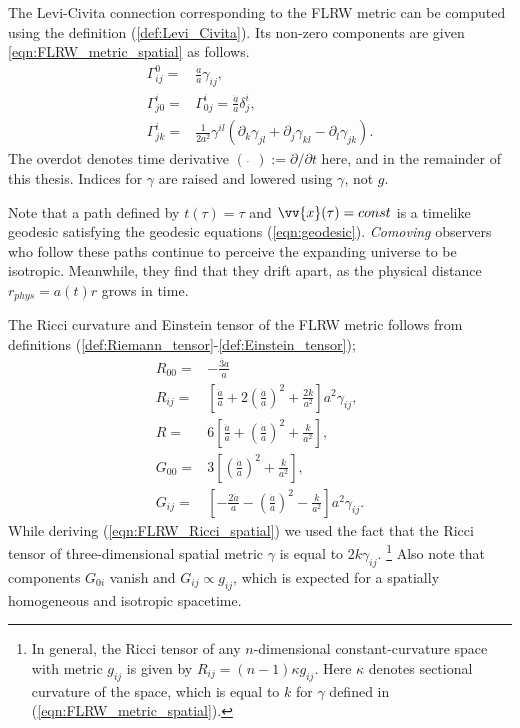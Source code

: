 \documentclass[a4paper,12pt,times,custombib,print,index]{Classes/PhDThesisPSnPDF} %
\providecommand{\DIFadd}[1]{{\protect\color{blue}\uwave{#1}}} %
\providecommand{\DIFaddbegin}{} %
\providecommand{\DIFaddend}{} %
\newcommand{\DIFaddincludegraphics}[2][]{{\color{blue}\fbox{\DIFOincludegraphics[#1]{#2}}}} %
\DeclareRobustCommand{\DIFaddbegin}{\DIFOaddbegin \let\includegraphics\DIFaddincludegraphics} %
\DeclareRobustCommand{\DIFaddend}{\DIFOaddend \let\includegraphics\DIFOincludegraphics} %
\begin{document}
The Levi-Civita connection corresponding to the FLRW metric can be computed using the definition (\ref{def:Levi_Civita}). Its non-zero components are given \DIFaddbegin \DIFadd{in terms of $\gamma$ }\eqref{eqn:FLRW_metric_spatial} \DIFaddend as follows.
\begin{align}
	\Gamma^0_{ij} =& \frac{\dot{a}}{a} \gamma_{ij}, \label{eqn:homogenous_christoffel_1}\\
	\Gamma^i_{j0} =& \Gamma^i_{0j} = \frac{\dot{a}}{a} \delta^i_j, \label{eqn:homogenous_christoffel_2}\\
	\Gamma^i_{jk} =& \frac{1}{2a^2} \gamma^{il} \left( \partial_k \gamma_{jl} + \partial_j \gamma_{kl} - \partial_l \gamma_{jk} \right).  \label{eqn:homogenous_christoffel_3}
\end{align}
The overdot denotes time derivative $(\,\, \dot{} \,\,) := \partial/\partial t$ here, and in the remainder of this thesis. Indices for $\gamma$ are raised and lowered using $\gamma$, not $g$.

Note that a path defined by $t(\tau)=\tau$ and $\vv{x}(\tau)=const$ is a timelike geodesic satisfying the geodesic equations (\ref{eqn:geodesic}). \textit{Comoving} observers who follow these paths continue to perceive the expanding universe to be isotropic. Meanwhile, they find that they drift apart, as the physical distance $r_{phys} = a(t) r$ grows in time.

The Ricci curvature and Einstein tensor of the FLRW metric follows from definitions (\ref{def:Riemann_tensor}-\ref{def:Einstein_tensor});
\begin{align}
	R_{00} =& - \frac{\ddot{3a}}{a} \\
	R_{ij} =& \left[ \frac{\ddot{a}}{a} + 2 \left( \frac{\dot{a}}{a} \right)^2 + \frac{2k}{a^2} \right] a^2 \gamma_{ij}, \label{eqn:FLRW_Ricci_spatial}\\
	R =& 6 \left[ \frac{\ddot{a}}{a} + \left( \frac{\dot{a}}{a} \right)^2 + \frac{k}{a^2} \right], \\
	G_{00} =& 3 \left[ \left( \frac{\dot{a}}{a} \right)^2 + \frac{k}{a^2} \right], \label{eqn:Einstein_tensor_FLRW_00} \\
	G_{ij} =& \left[ - \frac{2\ddot{a}}{a} - \left( \frac{\dot{a}}{a} \right)^2 - \frac{k}{a^2} \right] a^2 \gamma_{ij}. \label{eqn:Einstein_tensor_FLRW_ij}
\end{align}
While deriving (\ref{eqn:FLRW_Ricci_spatial}) we used the fact that the Ricci tensor of three-dimensional spatial metric $\gamma$ is equal to $2k\gamma_{ij}$. \footnote{In general, the Ricci tensor of any $n$-dimensional constant-curvature space with metric $g_{ij}$ is given by $R_{ij} = (n-1)\kappa g_{ij}$. Here $\kappa$ denotes sectional curvature of the space, which is equal to $k$ for $\gamma$ defined in (\ref{eqn:FLRW_metric_spatial}).} Also note that components $G_{0i}$ vanish and $G_{ij} \propto g_{ij}$, which is expected for a spatially homogeneous and isotropic spacetime.
\end{document}
